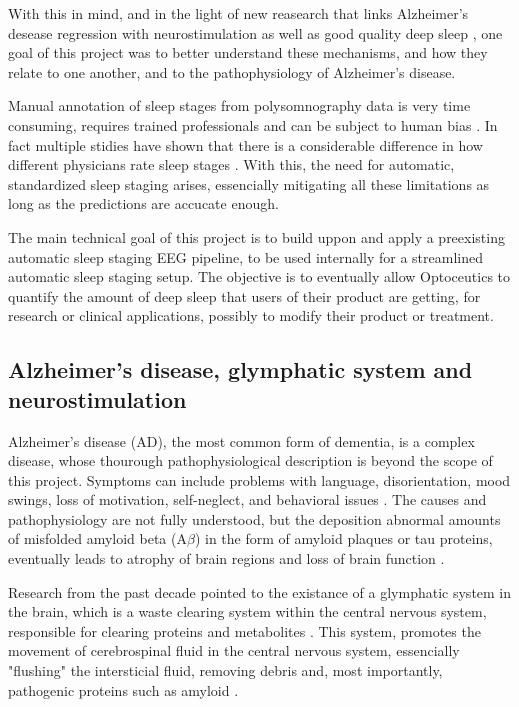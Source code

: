 With this in mind, and in the light of new reasearch that links Alzheimer's desease regression with neurostimulation as well as good quality deep sleep \cite{2019sleepCausesAD, nedergaard2020glymphaticFailure,2014sleepAD}, one goal of this project was to better understand these mechanisms, and how they relate to one another, and to the pathophysiology of Alzheimer's disease.

Manual annotation of sleep stages from polysomnography data is very time consuming, requires trained professionals and can be subject to human bias \cite{2022automaticEEG}. In fact multiple stidies have shown that there is a considerable difference in how different physicians rate sleep stages \cite{Alexander2020}. With this, the need for automatic, standardized sleep staging arises, essencially mitigating all these limitations as long as the predictions are accucate enough.

The main technical goal of this project is to build uppon and apply a preexisting automatic sleep staging EEG pipeline, to be used internally for a streamlined automatic sleep staging setup. The objective is to eventually allow Optoceutics to quantify the amount of deep sleep that users of their product are getting, for research or clinical applications, possibly to modify their product or treatment.



\subsection{Alzheimer's disease, glymphatic system and neurostimulation}
Alzheimer's disease (AD), the most common form of dementia, is a complex disease, whose thourough pathophysiological description is beyond the scope of this project. Symptoms can include problems with language, disorientation, mood swings, loss of motivation, self-neglect, and behavioral issues \cite{who2023}. The causes and pathophysiology are not fully understood, but the deposition abnormal amounts of misfolded amyloid beta (A$\beta$) in the form of amyloid plaques or tau proteins, eventually leads to atrophy of brain regions and loss of brain function \cite{nhs2021}.

Research from the past decade pointed to the existance of a glymphatic system in the brain, which is a waste clearing system within the central nervous system, responsible for clearing proteins and metabolites \cite{nedergaard2020glymphaticFailure, jessen2015glymphaticGuide}. This system, promotes the movement of cerebrospinal fluid in the central nervous system, essencially "flushing" the intersticial fluid, removing debris and, most importantly, pathogenic proteins such as amyloid \cite{2024gammaClearance}.

